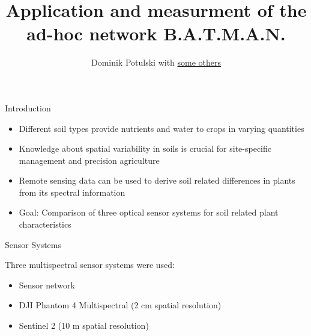 \documentclass[final,hyperref={pdfpagelabels=false}]{beamer}
\title{Application and measurment of the ad-hoc network B.A.T.M.A.N.}
\author{Dominik Potulski with  \underline{some others}}
\begin{document}
\begin{frame}
\centering

\begin{minipage}[t][20cm][t]{0.315\paperwidth}


\begin{block}{Introduction}
\centering
\begin{minipage}{0.95\textwidth}
\small{\begin{itemize}
    \item Different soil types provide nutrients and water to crops in varying quantities \cite{saxton1986estimating}
    \item Knowledge about spatial variability in soils is crucial for site-specific management and precision agriculture \cite{khosla2002use}
    \item Remote sensing data can be used to derive soil related differences in plants from its spectral information \cite{weiss2020remote}
    \item Goal: Comparison of three optical sensor systems for soil related plant characteristics
\end{itemize}}
\vspace{0.65cm}
\end{minipage}
\end{block}
\end{minipage}
\hspace{4mm}
\begin{minipage}[t][20cm][t]{0.315\paperwidth}
\begin{block}{Sensor Systems }
\begin{minipage}{0.95\textwidth}
\centering
\end{minipage}
\vspace{0.3cm}
\begin{minipage}{0.95\textwidth}
\small{
Three multispectral sensor systems were used:
\begin{itemize}
    \item Sensor network \cite{hanel2019using, hanel2021learning}
    \item DJI Phantom 4 Multispectral (2 cm spatial resolution)
    \item Sentinel 2 (10 m spatial resolution)
\end{itemize}
}
\centering
\vspace{1cm}
\end{minipage}
\end{block}
\end{minipage}
\end{frame}
\end{document}
